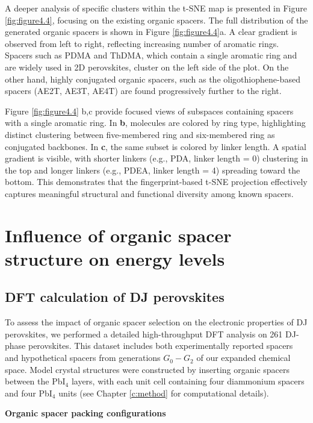 A deeper analysis of specific clusters within the t-SNE map is presented in Figure \ref{fig:figure4.4}, focusing on the existing organic spacers. The full distribution of the generated organic spacers is shown in Figure \ref{fig:figure4.4}a. A clear gradient is observed from left to right, reflecting increasing number of aromatic rings. Spacers such as PDMA and ThDMA, which contain a single aromatic ring and are widely used in 2D perovskites, cluster on the left side of the plot. On the other hand, highly conjugated organic spacers, such as the oligothiophene-based spacers (AE2T, AE3T, AE4T) are found progressively further to the right.

Figure \ref{fig:figure4.4} b,c provide focused views of subspaces containing spacers with a single aromatic ring. In \textbf{b}, molecules are colored by ring type, highlighting distinct clustering between five-membered ring and six-membered ring as conjugated backbones. In \textbf{c}, the same subset is colored by linker length. A spatial gradient is visible, with shorter linkers (e.g., PDA, linker length = 0) clustering in the top and longer linkers (e.g., PDEA, linker length = 4) spreading toward the bottom. This demonstrates that the fingerprint-based t-SNE projection effectively captures meaningful structural and functional diversity among known spacers.



\section{Influence of organic spacer structure on energy levels}\label{section:section4-2}

\subsection{DFT calculation of DJ perovskites}

To assess the impact of organic spacer selection on the electronic properties of DJ perovskites, we performed a detailed high-throughput DFT analysis on 261 DJ-phase perovskites. This dataset includes both experimentally reported spacers and hypothetical spacers from generations $G_0-G_2$ of our expanded chemical space. Model crystal structures were constructed by inserting organic spacers between the PbI$_4$ layers, with each unit cell containing four diammonium spacers and four PbI$_4$ units (see Chapter \ref{c:method} for computational details). 

\textbf{Organic spacer packing configurations}

